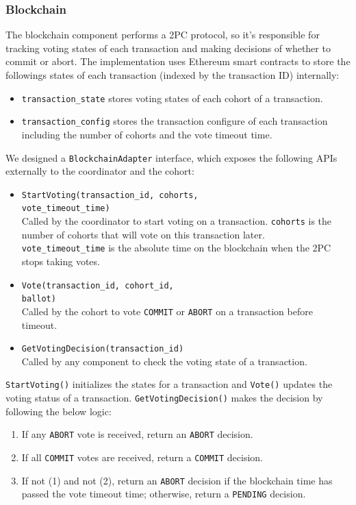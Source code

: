 \documentclass[11pt,sigplan,screen,nonacm]{acmart}
\begin{document}
\subsubsection{Blockchain} \label{blockchain}

The blockchain component performs a 2PC protocol, so it’s responsible for tracking voting states of each transaction and making decisions of whether to commit or abort. The implementation uses Ethereum smart contracts to store the followings states of each transaction (indexed by the transaction ID) internally:

\begin{itemize}
  \item \texttt{transaction\_state} stores voting states of each cohort of a transaction.
  \item \texttt{transaction\_config} stores the transaction configure of each transaction including the number of cohorts and the vote timeout time.
\end{itemize}

We designed a \texttt{BlockchainAdapter} interface, which exposes the following APIs externally to the coordinator and the cohort:
\begin{itemize}
  \item \texttt{StartVoting(transaction\_id, cohorts,\\ vote\_timeout\_time)}\\Called by the coordinator to start voting on a transaction. \texttt{cohorts} is the number of cohorts that will vote on this transaction later.\\\texttt{vote\_timeout\_time} is the absolute time on the blockchain when the 2PC stops taking votes.
  \item \texttt{Vote(transaction\_id, cohort\_id,\\ballot)}\\Called by the cohort to vote \texttt{COMMIT} or \texttt{ABORT} on a transaction before timeout.
  \item \texttt{GetVotingDecision(transaction\_id)}\\Called by any component to check the voting state of a transaction.
\end{itemize}

\texttt{StartVoting()} initializes the states for a transaction and \texttt{Vote()} updates the voting status of a transaction. \texttt{GetVotingDecision()} makes the decision by following the below logic:
\begin{enumerate}
  \item If any \texttt{ABORT} vote is received, return an \texttt{ABORT} decision.
  \item If all \texttt{COMMIT} votes are received, return a \texttt{COMMIT} decision.
  \item If not (1) and not (2), return an \texttt{ABORT} decision if the blockchain time has passed the vote timeout time; otherwise, return a \texttt{PENDING} decision.
\end{enumerate}
\end{document}
